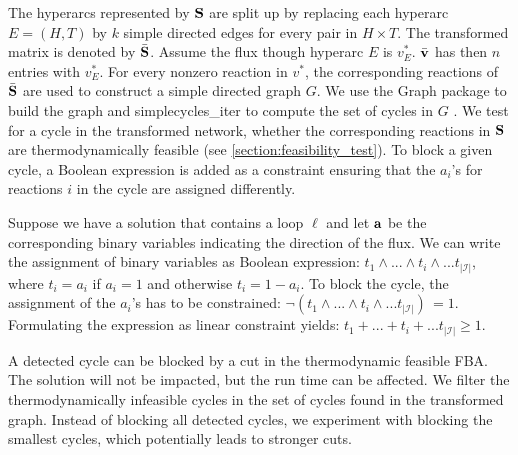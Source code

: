 The hyperarcs represented by $\bold S$ are split up by replacing each hyperarc $E= (H,T)$ by $k$ simple directed edges for every pair in $H \times T$. The transformed matrix is denoted by $\bar{\bold S}$. Assume the flux though hyperarc $E$ is $v^*_E$. $\bar{\bold v}$ has then $n$ entries with $v^*_E$.
For every nonzero reaction in $v^*$, the corresponding reactions of $\bar{\bold S}$ are used to construct a simple directed graph $G$. We use the \textsf{Graph} package to build the graph and \textsf{simplecycles\_iter} %
to compute the set of cycles in $G$ \cite{Graphs2021}. We test for a cycle in the transformed network, whether the corresponding reactions in $\bold S$ are thermodynamically feasible (see \cref{section:feasibility_test}).
To block a given cycle, a Boolean expression is added as a constraint ensuring that the $a_i$'s for reactions $i$ in the cycle are assigned differently. 

Suppose we have a solution that contains a loop $\boldsymbol \ell$ %
and let $\bold a$ be the corresponding binary variables indicating the direction of the flux. We can write the assignment of binary variables as Boolean expression: $t_1 \land ... \land t_i \land ... t_{|\mathcal{I}|}$, where $t_i = a_i$ if $a_i=1$ and otherwise $t_i = 1 -a_i$.
To block the cycle, the assignment of the $a_i$'s has to be constrained: 
    $\neg (t_1 \land ... \land t_i \land ... t_{|\mathcal{I}|}) \, = 1$.
Formulating the expression as linear constraint yields:
    $t_1 + ... + t_i + ... t_{|\mathcal{I}|} \geq 1$.

A detected cycle can be blocked by a cut in the thermodynamic feasible FBA. The solution will not be impacted, but the run time can be affected. 
We filter the thermodynamically infeasible cycles in the set of cycles found in the transformed graph. Instead of blocking all detected cycles, we experiment with blocking the smallest cycles, which potentially leads to stronger cuts. 


